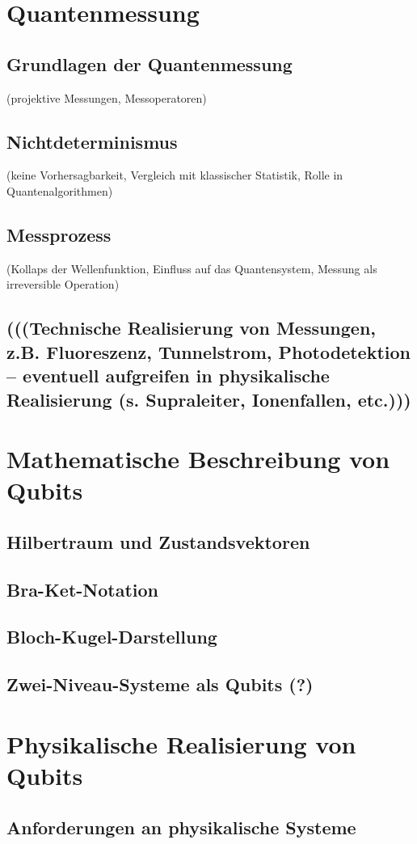 \section{Quantenmessung }
\subsection{Grundlagen der Quantenmessung }
(projektive Messungen, Messoperatoren)
\subsection{Nichtdeterminismus}
(keine Vorhersagbarkeit, Vergleich mit klassischer Statistik, Rolle in Quantenalgorithmen) 
\subsection{Messprozess }
(Kollaps der Wellenfunktion, Einfluss auf das Quantensystem, Messung als irreversible Operation) 
\subsection{(((Technische Realisierung von Messungen, z.B. Fluoreszenz, Tunnelstrom, Photodetektion – eventuell aufgreifen in physikalische Realisierung (s. Supraleiter, Ionenfallen, etc.))) }
\section{Mathematische Beschreibung von Qubits }
\subsection{Hilbertraum und Zustandsvektoren }
\subsection{Bra-Ket-Notation }
\subsection{Bloch-Kugel-Darstellung }
\subsection{Zwei-Niveau-Systeme als Qubits (?) }
\section{Physikalische Realisierung von Qubits }
\subsection{Anforderungen an physikalische Systeme }

